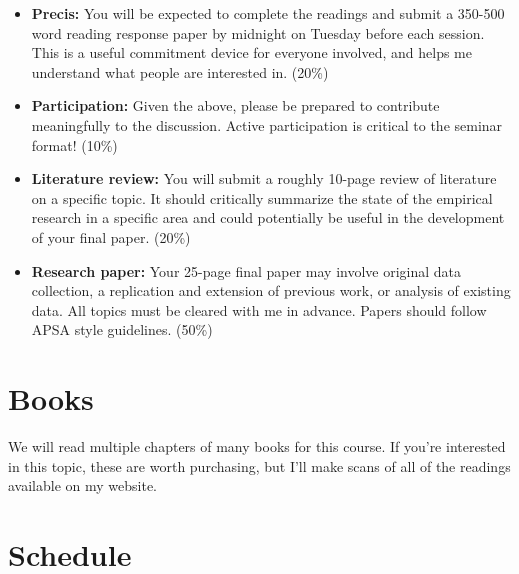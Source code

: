 \vspace{-.1in}\documentclass[11pt]{article}
\begin{document}
\begin{itemize}
	
\item {\bf Precis:} You will be expected to complete the readings and submit a 350-500 word reading response paper by midnight on Tuesday before each session. This is a useful commitment device for everyone involved, and helps me understand what people are interested in. (20\%)	
	
\item {\bf Participation:} Given the above, please be prepared to contribute meaningfully to the discussion. Active participation is critical to the seminar format! (10\%)

\item {\bf Literature review:} You will submit a roughly 10-page review of literature on a specific topic. It should critically summarize the state of the empirical research in a specific area and could potentially be useful in the development of your final paper. (20\%) %
\item {\bf Research paper:} Your 25-page final paper may involve original data collection, a replication and extension of previous work, or analysis of existing data. All topics must be cleared with me in advance. Papers should follow APSA style guidelines. (50\%) %
\end{itemize}

\section*{Books}




\noindent We will read multiple chapters of many books for this course. If you're interested in this topic, these are worth purchasing, but I'll make scans of all of the readings available on my website.



\clearpage
\section*{Schedule}
\end{document}
